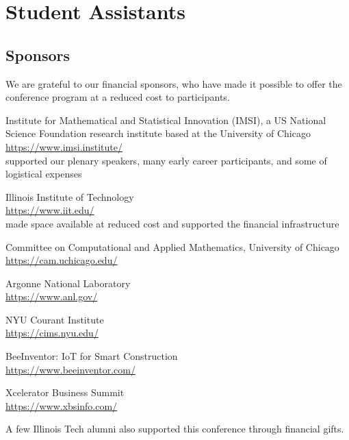 \section{Student Assistants}


\subsection{Sponsors}

We are grateful to our financial sponsors, who have made it possible to offer the conference program at a reduced cost to participants.

Institute for Mathematical and Statistical Innovation (IMSI), a US National Science Foundation research institute based at the University of Chicago\\
\url{https://www.imsi.institute/} \\
supported our plenary speakers, many early career participants, and some of logistical expenses

Illinois Institute of Technology\\
\url{https://www.iit.edu/} \\
made space available at reduced cost and supported the financial infrastructure

Committee on Computational and Applied Mathematics, University of Chicago\\
\url{https://cam.uchicago.edu/}

Argonne National Laboratory\\
\url{https://www.anl.gov/}

NYU Courant Institute\\
\url{https://cims.nyu.edu/}

BeeInventor: IoT for Smart Construction\\
\url{https://www.beeinventor.com/}

Xcelerator Business Summit\\
\url{https://www.xbsinfo.com/}

A few Illinois Tech alumni also supported this conference through financial gifts.

\newpage

